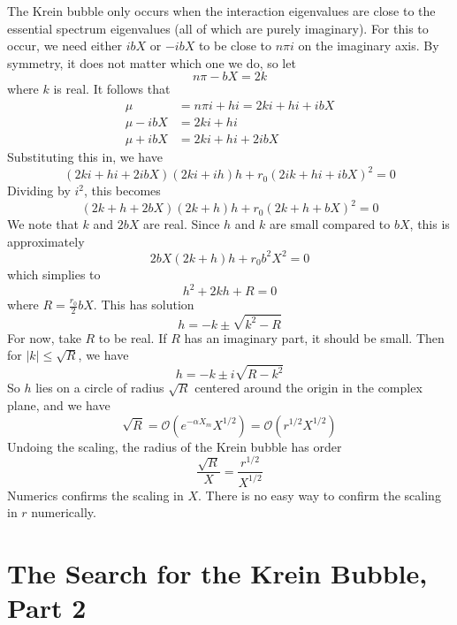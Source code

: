 \documentclass[thesis.tex]{subfiles}
\begin{document}
The Krein bubble only occurs when the interaction eigenvalues are close to the essential spectrum eigenvalues (all of which are purely imaginary). For this to occur, we need either $i b X$ or $-i b X$ to be close to $n \pi i$ on the imaginary axis. By symmetry, it does not matter which one we do, so let
\[
n \pi - b X = 2 k
\]
where $k$ is real. It follows that
\begin{align*}
\mu &= n \pi i + h i = 2 k i + h i + i b X \\
\mu - i b X &= 2 k i + h i\\
\mu + i b X &= 2 k i + h i + 2 i b X
\end{align*}
Substituting this in, we have
\[
(2 k i + h i + 2i bX)(2k i + i h) h + r_0 (2 i k + h i + i b X)^2 = 0
\]
Dividing by $i^2$, this becomes
\[
(2 k + h + 2bX)(2k + h) h + r_0 (2 k + h + b X)^2 = 0
\]
We note that $k$ and $2bX$ are real. Since $h$ and $k$ are small compared to $b X$, this is approximately
\[
2bX(2k + h) h + r_0 b^2 X^2 = 0
\]
which simplies to
\[
h^2 + 2kh + R  = 0
\]
where $R = \frac{r_0}{2} b X$. This has solution
\[
h = -k \pm \sqrt{k^2 - R}
\]
For now, take $R$ to be real. If $R$ has an imaginary part, it should be small. Then for $|k| \leq \sqrt{R}$, we have
\[
h = -k \pm i \sqrt{R - k^2}
\]
So $h$ lies on a circle of radius $\sqrt{R}$ centered around the origin in the complex plane, and we have
\[
\sqrt{R} = \mathcal{O}(e^{-\alpha X_m}X^{1/2}) = \mathcal{O}(r^{1/2} X^{1/2})
\]
Undoing the scaling, the radius of the Krein bubble has order
\[
\frac{\sqrt{R}}{X} = \frac{r^{1/2}}{X^{1/2}}
\] 
Numerics confirms the scaling in $X$. There is no easy way to confirm the scaling in $r$ numerically.

\section{The Search for the Krein Bubble, Part 2}
\end{document}

